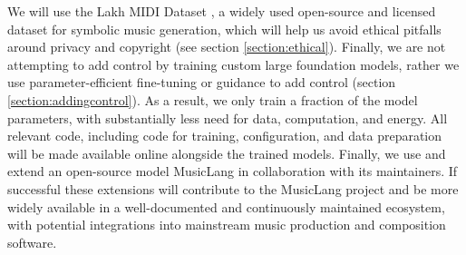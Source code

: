 We will use the Lakh MIDI Dataset \cite{Raffel_2016}, a widely used open-source and licensed dataset for symbolic music generation, which will help us avoid ethical pitfalls around privacy and copyright (see section \ref{section:ethical}). Finally, we are not attempting to add control by training custom large foundation models, rather we use parameter-efficient fine-tuning or guidance to add control (section \ref{section:addingcontrol}).  As a result, we only train a fraction of the model parameters, with substantially less need for data, computation, and energy. All relevant code, including code for training, configuration, and data preparation will be made available online alongside the trained models. Finally, we use and extend an open-source model MusicLang in collaboration with its maintainers. If successful these extensions will contribute to the MusicLang project and be more widely available in a well-documented and continuously maintained ecosystem, with potential integrations into mainstream music production and composition software. 

